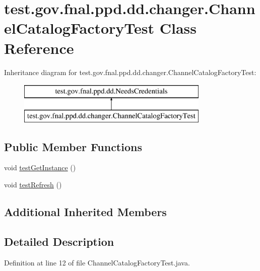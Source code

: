 \hypertarget{classtest_1_1gov_1_1fnal_1_1ppd_1_1dd_1_1changer_1_1ChannelCatalogFactoryTest}{\section{test.\-gov.\-fnal.\-ppd.\-dd.\-changer.\-Channel\-Catalog\-Factory\-Test Class Reference}
\label{classtest_1_1gov_1_1fnal_1_1ppd_1_1dd_1_1changer_1_1ChannelCatalogFactoryTest}
}
Inheritance diagram for test.\-gov.\-fnal.\-ppd.\-dd.\-changer.\-Channel\-Catalog\-Factory\-Test\-:\begin{figure}[H]
\begin{center}
\leavevmode
\includegraphics[height=2.000000cm]{classtest_1_1gov_1_1fnal_1_1ppd_1_1dd_1_1changer_1_1ChannelCatalogFactoryTest}
\end{center}
\end{figure}
\subsection*{Public Member Functions}
\begin{DoxyCompactItemize}
\item 
void \hyperlink{classtest_1_1gov_1_1fnal_1_1ppd_1_1dd_1_1changer_1_1ChannelCatalogFactoryTest_a0f381506eaec142e6ffdd0c4ea09bcba}{test\-Get\-Instance} ()
\item 
void \hyperlink{classtest_1_1gov_1_1fnal_1_1ppd_1_1dd_1_1changer_1_1ChannelCatalogFactoryTest_a4874cd96233775a71b46d9ff235ffb7e}{test\-Refresh} ()
\end{DoxyCompactItemize}
\subsection*{Additional Inherited Members}


\subsection{Detailed Description}


Definition at line 12 of file Channel\-Catalog\-Factory\-Test.\-java.



